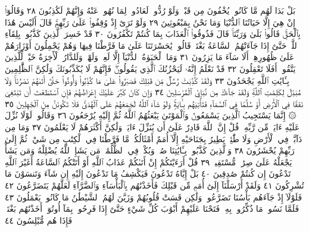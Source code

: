 بَلْ بَدَا لَهُم مَّا كَانُوا۟ يُخْفُونَ مِن قَبْلُۖ وَلَوْ رُدُّوا۟ لَعَادُوا۟ لِمَا نُهُوا۟ عَنْهُ
وَإِنَّهُمْ لَكَٰذِبُونَ ٢٨ وَقَالُوٓا۟ إِنْ هِيَ إِلَّا حَيَاتُنَا ٱلدُّنْيَا وَمَا نَحْنُ
بِمَبْعُوثِينَ ٢٩ وَلَوْ تَرَىٰٓ إِذْ وُقِفُوا۟ عَلَىٰ رَبِّهِمْۚ قَالَ أَلَيْسَ هَٰذَا
بِٱلْحَقِّۚ قَالُوا۟ بَلَىٰ وَرَبِّنَاۚ قَالَ فَذُوقُوا۟ ٱلْعَذَابَ بِمَا كُنتُمْ تَكْفُرُونَ ٣٠
قَدْ خَسِرَ ٱلَّذِينَ كَذَّبُوا۟ بِلِقَآءِ ٱللَّهِۖ حَتَّىٰٓ إِذَا جَآءَتْهُمُ ٱلسَّاعَةُ
بَغْتَةࣰ قَالُوا۟ يَٰحَسْرَتَنَا عَلَىٰ مَا فَرَّطْنَا فِيهَا وَهُمْ يَحْمِلُونَ أَوْزَارَهُمْ
عَلَىٰ ظُهُورِهِمْۚ أَلَا سَآءَ مَا يَزِرُونَ ٣١ وَمَا ٱلْحَيَوٰةُ ٱلدُّنْيَآ
إِلَّا لَعِبࣱ وَلَهْوࣱۖ وَلَلدَّارُ ٱلْأٓخِرَةُ خَيْرࣱ لِّلَّذِينَ يَتَّقُونَۚ أَفَلَا تَعْقِلُونَ ٣٢
قَدْ نَعْلَمُ إِنَّهُۥ لَيَحْزُنُكَ ٱلَّذِي يَقُولُونَۖ فَإِنَّهُمْ لَا يُكَذِّبُونَكَ
وَلَٰكِنَّ ٱلظَّٰلِمِينَ بِـَٔايَٰتِ ٱللَّهِ يَجْحَدُونَ ٣٣ وَلَقَدْ كُذِّبَتْ
رُسُلࣱ مِّن قَبْلِكَ فَصَبَرُوا۟ عَلَىٰ مَا كُذِّبُوا۟ وَأُوذُوا۟ حَتَّىٰٓ أَتَىٰهُمْ نَصْرُنَاۚ
وَلَا مُبَدِّلَ لِكَلِمَٰتِ ٱللَّهِۚ وَلَقَدْ جَآءَكَ مِن نَّبَإِي۟ ٱلْمُرْسَلِينَ ٣٤
وَإِن كَانَ كَبُرَ عَلَيْكَ إِعْرَاضُهُمْ فَإِنِ ٱسْتَطَعْتَ أَن تَبْتَغِيَ
نَفَقࣰا فِي ٱلْأَرْضِ أَوْ سُلَّمࣰا فِي ٱلسَّمَآءِ فَتَأْتِيَهُم بِـَٔايَةࣲۚ وَلَوْ شَآءَ
ٱللَّهُ لَجَمَعَهُمْ عَلَى ٱلْهُدَىٰۚ فَلَا تَكُونَنَّ مِنَ ٱلْجَٰهِلِينَ ٣٥
۞ إِنَّمَا يَسْتَجِيبُ ٱلَّذِينَ يَسْمَعُونَۘ وَٱلْمَوْتَىٰ يَبْعَثُهُمُ ٱللَّهُ ثُمَّ إِلَيْهِ
يُرْجَعُونَ ٣٦ وَقَالُوا۟ لَوْلَا نُزِّلَ عَلَيْهِ ءَايَةࣱ مِّن رَّبِّهِۦۚ قُلْ إِنَّ ٱللَّهَ
قَادِرٌ عَلَىٰٓ أَن يُنَزِّلَ ءَايَةࣰ وَلَٰكِنَّ أَكْثَرَهُمْ لَا يَعْلَمُونَ ٣٧ وَمَا
مِن دَآبَّةࣲ فِي ٱلْأَرْضِ وَلَا طَٰٓئِرࣲ يَطِيرُ بِجَنَاحَيْهِ إِلَّآ أُمَمٌ أَمْثَالُكُمۚ
مَّا فَرَّطْنَا فِي ٱلْكِتَٰبِ مِن شَيْءࣲۚ ثُمَّ إِلَىٰ رَبِّهِمْ يُحْشَرُونَ ٣٨
وَٱلَّذِينَ كَذَّبُوا۟ بِـَٔايَٰتِنَا صُمࣱّ وَبُكْمࣱ فِي ٱلظُّلُمَٰتِۗ مَن يَشَإِ
ٱللَّهُ يُضْلِلْهُ وَمَن يَشَأْ يَجْعَلْهُ عَلَىٰ صِرَٰطࣲ مُّسْتَقِيمࣲ ٣٩ قُلْ
أَرَءَيْتَكُمْ إِنْ أَتَىٰكُمْ عَذَابُ ٱللَّهِ أَوْ أَتَتْكُمُ ٱلسَّاعَةُ أَغَيْرَ ٱللَّهِ
تَدْعُونَ إِن كُنتُمْ صَٰدِقِينَ ٤٠ بَلْ إِيَّاهُ تَدْعُونَ فَيَكْشِفُ
مَا تَدْعُونَ إِلَيْهِ إِن شَآءَ وَتَنسَوْنَ مَا تُشْرِكُونَ ٤١ وَلَقَدْ أَرْسَلْنَآ
إِلَىٰٓ أُمَمࣲ مِّن قَبْلِكَ فَأَخَذْنَٰهُم بِٱلْبَأْسَآءِ وَٱلضَّرَّآءِ لَعَلَّهُمْ
يَتَضَرَّعُونَ ٤٢ فَلَوْلَآ إِذْ جَآءَهُم بَأْسُنَا تَضَرَّعُوا۟ وَلَٰكِن قَسَتْ
قُلُوبُهُمْ وَزَيَّنَ لَهُمُ ٱلشَّيْطَٰنُ مَا كَانُوا۟ يَعْمَلُونَ ٤٣ فَلَمَّا
نَسُوا۟ مَا ذُكِّرُوا۟ بِهِۦ فَتَحْنَا عَلَيْهِمْ أَبْوَٰبَ كُلِّ شَيْءٍ حَتَّىٰٓ
إِذَا فَرِحُوا۟ بِمَآ أُوتُوٓا۟ أَخَذْنَٰهُم بَغْتَةࣰ فَإِذَا هُم مُّبْلِسُونَ ٤٤
